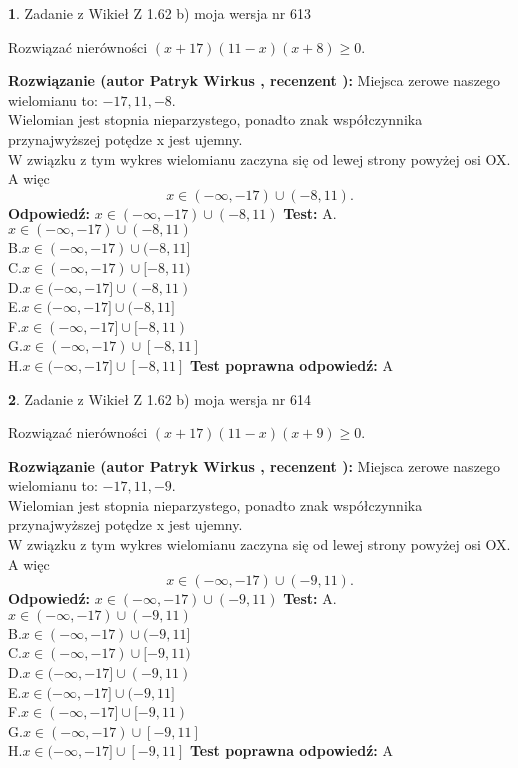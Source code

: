 \documentclass[12pt, a4paper]{article}
\theoremstyle{definition} %
\newtheorem{zad}{}
\newcommand{\zadStart}[1]{\begin{zad}#1\newline}
\newcommand{\zadStop}{\end{zad}}
\newcommand{\rozwStart}[2]{\noindent \textbf{Rozwiązanie (autor #1 , recenzent #2): }\newline}
\newcommand{\rozwStop}{\newline}
\newcommand{\odpStart}{\noindent \textbf{Odpowiedź:}\newline}
\newcommand{\odpStop}{\newline}
\newcommand{\testStart}{\noindent \textbf{Test:}\newline}
\newcommand{\testStop}{\newline}
\newcommand{\kluczStart}{\noindent \textbf{Test poprawna odpowiedź:}\newline}
\newcommand{\kluczStop}{\newline}
\begin{document}
\zadStart{Zadanie z Wikieł Z 1.62 b) moja wersja nr 613}

Rozwiązać nierówności $(x+17)(11-x)(x+8)\ge0$.
\zadStop
\rozwStart{Patryk Wirkus}{}
Miejsca zerowe naszego wielomianu to: $-17, 11, -8$.\\
Wielomian jest stopnia nieparzystego, ponadto znak współczynnika przy\linebreak najwyższej potędze x jest ujemny.\\ W związku z tym wykres wielomianu zaczyna się od lewej strony powyżej osi OX. A więc $$x \in (-\infty,-17) \cup (-8,11).$$
\rozwStop
\odpStart
$x \in (-\infty,-17) \cup (-8,11)$
\odpStop
\testStart
A.$x \in (-\infty,-17) \cup (-8,11)$\\
B.$x \in (-\infty,-17) \cup (-8,11]$\\
C.$x \in (-\infty,-17) \cup [-8,11)$\\
D.$x \in (-\infty,-17] \cup (-8,11)$\\
E.$x \in (-\infty,-17] \cup (-8,11]$\\
F.$x \in (-\infty,-17] \cup [-8,11)$\\
G.$x \in (-\infty,-17) \cup [-8,11]$\\
H.$x \in (-\infty,-17] \cup [-8,11]$
\testStop
\kluczStart
A
\kluczStop



\zadStart{Zadanie z Wikieł Z 1.62 b) moja wersja nr 614}

Rozwiązać nierówności $(x+17)(11-x)(x+9)\ge0$.
\zadStop
\rozwStart{Patryk Wirkus}{}
Miejsca zerowe naszego wielomianu to: $-17, 11, -9$.\\
Wielomian jest stopnia nieparzystego, ponadto znak współczynnika przy\linebreak najwyższej potędze x jest ujemny.\\ W związku z tym wykres wielomianu zaczyna się od lewej strony powyżej osi OX. A więc $$x \in (-\infty,-17) \cup (-9,11).$$
\rozwStop
\odpStart
$x \in (-\infty,-17) \cup (-9,11)$
\odpStop
\testStart
A.$x \in (-\infty,-17) \cup (-9,11)$\\
B.$x \in (-\infty,-17) \cup (-9,11]$\\
C.$x \in (-\infty,-17) \cup [-9,11)$\\
D.$x \in (-\infty,-17] \cup (-9,11)$\\
E.$x \in (-\infty,-17] \cup (-9,11]$\\
F.$x \in (-\infty,-17] \cup [-9,11)$\\
G.$x \in (-\infty,-17) \cup [-9,11]$\\
H.$x \in (-\infty,-17] \cup [-9,11]$
\testStop
\kluczStart
A
\kluczStop
\end{document}
